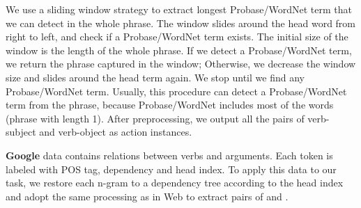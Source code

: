 We use a sliding window strategy to extract longest
Probase/WordNet term that we can detect in the whole phrase.
The window slides around the head word
from right to left, and check if a Probase/WordNet term exists.
The initial size of the window is the length of the
whole phrase. If we detect a Probase/WordNet term,
we return the phrase captured in the window;
Otherwise, we decrease the window size and slides
around the head term again. We stop until we find
any Probase/WordNet term. Usually, this procedure can detect
a Probase/WordNet term from the phrase, because Probase/WordNet includes
most of the words (phrase with length 1). After
preprocessing, we output all the pairs of verb-subject and
verb-object as action instances.

\textbf{Google} data contains relations between
verbs and arguments.
Each token is labeled with POS tag, dependency and head index.
To apply this data to our task,
we restore each n-gram to a dependency tree according
to the head index and 
adopt the same processing as in Web to extract 
pairs of  and .

